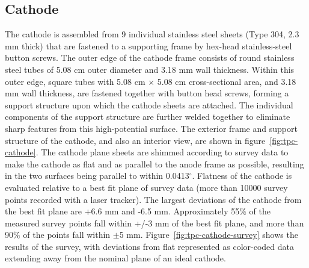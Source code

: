 \subsection{Cathode}
The cathode is assembled from 9 individual stainless steel sheets (Type 304, 2.3 mm thick) that are fastened to a supporting frame by hex-head stainless-steel button screws. The outer edge of the cathode frame consists of round stainless steel tubes of 5.08 cm outer diameter and 3.18 mm wall thickness.  Within this outer edge, square tubes with 5.08 cm $\times$ 5.08 cm cross-sectional area, and 3.18 mm wall thickness, are fastened together with button head screws, forming a support structure upon which the cathode sheets are attached.  The individual components of the support structure are further welded together to eliminate sharp features from this high-potential surface.  The exterior frame and support structure of the cathode, and also an interior view, are shown in figure~\ref{fig:tpc-cathode}. The cathode plane sheets are shimmed according to survey data to make the cathode as flat and as parallel to the anode frame as possible, resulting in the two surfaces being parallel to within 0.0413$^{\circ}$.  Flatness of the cathode is evaluated relative to a best fit plane of survey data (more than 10000 survey points recorded with a laser tracker). The largest deviations of the cathode from the best fit plane are +6.6 mm and -6.5 mm. Approximately 55$\%$ of the measured survey points fall within +/-3 mm of the best fit plane, and more than 90$\%$ of the points fall within $\pm$5 mm.  Figure~\ref{fig:tpc-cathode-survey} shows the results of the survey, with deviations from flat represented as color-coded data extending away from the nominal plane of an ideal cathode. %

